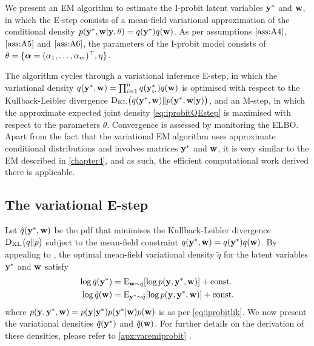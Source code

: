 We present an EM algorithm to estimate the I-probit latent variables ${\mathbf y}^*$ and ${\mathbf w}$, in which the E-step consists of a mean-field variational approximation of the conditional density $p({\mathbf y}^*,{\mathbf w}|{\mathbf y},\theta) = q({\mathbf y}^*)q({\mathbf w})$.
As per assumptions $\ref{ass:A4}$, $\ref{ass:A5}$ and $\ref{ass:A6}$, the parameters of the I-probit model consists of $\theta =\{ {\bm\alpha} = (\alpha_1,\dots,\alpha_m)^\top,\eta \}$.

The algorithm cycles through a variational inference E-step, in which the variational density $q(\by^*,\bw) = \prod_{i=1}^n q(\by^*_{i\bigcdot}) q(\bw)$ is optimised with respect to the Kullback-Leibler divergence $\operatorname{D_{KL}\hspace{-1pt}}\big( q({\mathbf y}^*,{\mathbf w}) \Vert p({\mathbf y}^*,{\mathbf w}|{\mathbf y}) \big)$, and an M-step, in which the approximate expected joint density \cref{eq:iprobitQEstep} is maximised with respect to the parameters $\theta$. 
Convergence is assessed by monitoring the ELBO.
Apart from the fact that the variational EM algorithm uses approximate conditional distributions and involves matrices ${\mathbf y}^*$ and ${\mathbf w}$, it is very similar to the EM described in \cref{chapter4}, and as such, the efficient computational work derived there is applicable.

\subsection{The variational E-step}

Let $\tilde q({\mathbf y}^*,{\mathbf w})$ be the pdf that minimises the Kullback-Leibler divergence $\operatorname{D_{KL}\hspace{-1pt}}\big( q \Vert p \big)$ subject to the mean-field constraint $q({\mathbf y}^*,{\mathbf w}) = q({\mathbf y}^*)q({\mathbf w})$.
By appealing to \citet[Eq. 10.9, p. 466]{bishop2006pattern}, the optimal mean-field variational density $\tilde q$ for the latent variables ${\mathbf y}^*$ and ${\mathbf w}$ satisfy
\begin{align}
  \log \tilde q({\mathbf y}^*) &= \operatorname{E}_{{\mathbf w}\sim\tilde q} [\log p({\mathbf y},{\mathbf y}^*,{\mathbf w})] + \text{const.}\hspace{0.01em} \label{eq:logqystar} \\
  \log \tilde q({\mathbf w}) &= \operatorname{E}_{{\mathbf y}^*\sim\tilde q} [\log p({\mathbf y},{\mathbf y}^*,{\mathbf w})] + \text{const.}\hspace{0.01em} \label{eq:logqw}
\end{align}
where $p({\mathbf y},{\mathbf y}^*,{\mathbf w}) = p({\mathbf y}|{\mathbf y}^*) p({\mathbf y}^*|{\mathbf w}) p({\mathbf w})$ is as per \cref{eq:iprobitlik}.
We now present the variational densities $\tilde q({\mathbf y}^*)$ and $\tilde q({\mathbf w})$.
For further details on the derivation of these densities, please refer to \cref{apx:varemiprobit} .

